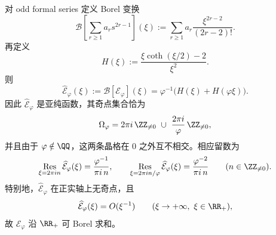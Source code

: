 \begin{theorem}\label{thm:xi-time-part9zbb-foldpi-borel-double-lattice}
对 odd formal series 定义 Borel 变换
\[
\mathcal B\!\left[\sum_{r\ge 1}a_r s^{2r-1}\right](\xi)
:=
\sum_{r\ge 1}a_r\frac{\xi^{2r-2}}{(2r-2)!}.
\]
再定义
\[
H(\xi):=\frac{\xi\coth(\xi/2)-2}{\xi^2}.
\]
则
\[
\widehat{\mathcal E}_\varphi(\xi):=\mathcal B[\mathcal E_\varphi](\xi)
=
\varphi^{-1}\bigl(H(\xi)+H(\varphi\xi)\bigr).
\]
因此 \(\widehat{\mathcal E}_\varphi\) 是亚纯函数，其奇点集合恰为
\[
\Omega_\varphi=
2\pi i\,\ZZ_{\neq 0}
\ \cup\
\frac{2\pi i}{\varphi}\,\ZZ_{\neq 0},
\]
并且由于 \(\varphi\notin\QQ\)，这两条晶格在 \(0\) 之外互不相交。相应留数为
\[
\operatorname*{Res}_{\xi=2\pi i n}\widehat{\mathcal E}_\varphi(\xi)
=
\frac{\varphi^{-1}}{\pi i\,n},
\qquad
\operatorname*{Res}_{\xi=2\pi i n/\varphi}\widehat{\mathcal E}_\varphi(\xi)
=
\frac{\varphi^{-2}}{\pi i\,n}
\qquad (n\in\ZZ_{\neq 0}).
\]
特别地，\(\widehat{\mathcal E}_\varphi\) 在正实轴上无奇点，且
\[
\widehat{\mathcal E}_\varphi(\xi)=O(\xi^{-1})
\qquad (\xi\to+\infty,\ \xi\in\RR_+),
\]
故 \(\mathcal E_\varphi\) 沿 \(\RR_+\) 可 Borel 求和。
\end{theorem}
